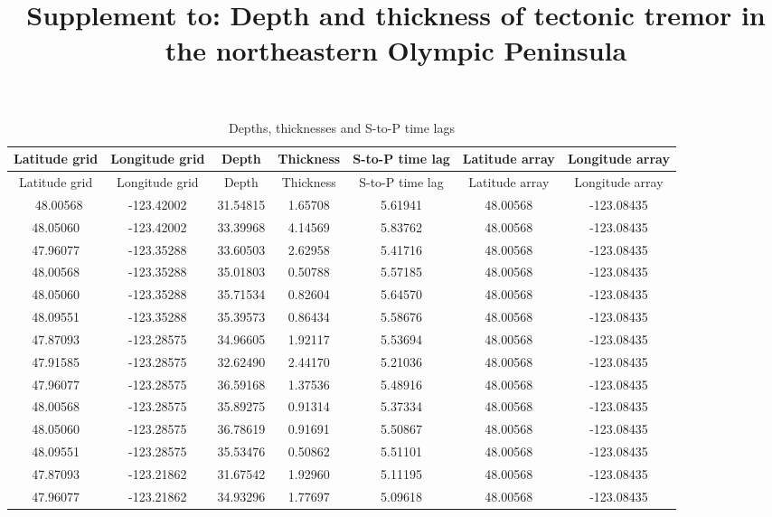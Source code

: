 \documentclass[draft]{agujournal2019}
\begin{document}
\title{Supplement to: Depth and thickness of tectonic tremor in the northeastern Olympic Peninsula}




\begin{center}
\begin{longtable}{c c c c c c c}
\caption{Depths, thicknesses and S-to-P time lags}\\
\hline
Latitude grid & Longitude grid & Depth & Thickness & S-to-P time lag & Latitude array & Longitude array \\ 
\hline
\endfirsthead
\hline
Latitude grid & Longitude grid & Depth & Thickness & S-to-P time lag & Latitude array & Longitude array \\ 
\hline
\endhead
\endfoot
\hline
\endlastfoot\
48.00568 & -123.42002 & 31.54815 & 1.65708 & 5.61941 & 48.00568 & -123.08435 \\
48.05060 & -123.42002 & 33.39968 & 4.14569 & 5.83762 & 48.00568 & -123.08435 \\
47.96077 & -123.35288 & 33.60503 & 2.62958 & 5.41716 & 48.00568 & -123.08435 \\
48.00568 & -123.35288 & 35.01803 & 0.50788 & 5.57185 & 48.00568 & -123.08435 \\
48.05060 & -123.35288 & 35.71534 & 0.82604 & 5.64570 & 48.00568 & -123.08435 \\
48.09551 & -123.35288 & 35.39573 & 0.86434 & 5.58676 & 48.00568 & -123.08435 \\
47.87093 & -123.28575 & 34.96605 & 1.92117 & 5.53694 & 48.00568 & -123.08435 \\
47.91585 & -123.28575 & 32.62490 & 2.44170 & 5.21036 & 48.00568 & -123.08435 \\
47.96077 & -123.28575 & 36.59168 & 1.37536 & 5.48916 & 48.00568 & -123.08435 \\
48.00568 & -123.28575 & 35.89275 & 0.91314 & 5.37334 & 48.00568 & -123.08435 \\
48.05060 & -123.28575 & 36.78619 & 0.91691 & 5.50867 & 48.00568 & -123.08435 \\
48.09551 & -123.28575 & 35.53476 & 0.50862 & 5.51101 & 48.00568 & -123.08435 \\
47.87093 & -123.21862 & 31.67542 & 1.92960 & 5.11195 & 48.00568 & -123.08435 \\
47.96077 & -123.21862 & 34.93296 & 1.77697 & 5.09618 & 48.00568 & -123.08435 \\

\end{longtable}
\end{center}
\end{document}
